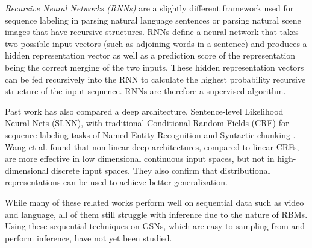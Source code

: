 \emph{Recursive Neural Networks (RNNs)} \cite{socher11} are a slightly different framework used for sequence labeling in parsing natural language sentences or parsing natural scene images that have recursive structures. RNNs define a neural network that takes two possible input vectors (such as adjoining words in a sentence) and produces a hidden representation vector as well as a prediction score of the representation being the correct merging of the two inputs. These hidden representation vectors can be fed recursively into the RNN to calculate the highest probability recursive structure of the input sequence. RNNs are therefore a supervised algorithm.

Past work has also compared a deep architecture, Sentence-level Likelihood Neural Nets (SLNN), with traditional Conditional Random Fields (CRF) for sequence labeling tasks of Named Entity Recognition and Syntactic chunking \cite{wang13}. Wang et al. found that non-linear deep architectures, compared to linear CRFs, are more effective in low dimensional continuous input spaces, but not in high-dimensional discrete input spaces. They also confirm that distributional representations can be used to achieve better generalization.

While many of these related works perform well on sequential data such as video and language, all of them still struggle with inference due to the nature of RBMs. Using these sequential techniques on GSNs, which are easy to  sampling from and perform inference, have not yet been studied.